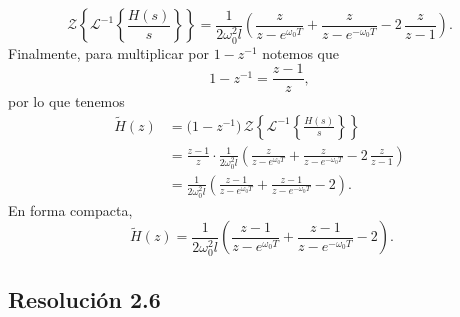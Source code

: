\documentclass[
  11pt,
  letterpaper,
   addpoints,
  answers
  ]{exam}
\begin{document}
\begin{questions}
\begin{solution}
\begin{equation}
\mathcal{Z}\!\left\{\mathcal{L}^{-1}\!\left\{\frac{H(s)}{s}\right\}\right\}
=\frac{1}{2\omega_0^{2} l}\left(
\frac{z}{z-e^{\omega_0 T}}+\frac{z}{z-e^{-\omega_0 T}}-2\,\frac{z}{z-1}
\right).
\end{equation}
Finalmente, para multiplicar por $1-z^{-1}$ notemos que
\begin{equation}
1-z^{-1}=\frac{z-1}{z},
\end{equation}
por lo que tenemos
\begin{align}
\tilde{H}(z)
&=\big(1-z^{-1}\big)\,\mathcal{Z}\!\left\{\mathcal{L}^{-1}\!\left\{\frac{H(s)}{s}\right\}\right\}\\
&=\frac{z-1}{z}\cdot\frac{1}{2\omega_0^{2} l}\left(
\frac{z}{z-e^{\omega_0 T}}+\frac{z}{z-e^{-\omega_0 T}}-2\,\frac{z}{z-1}
\right)\\
&=\frac{1}{2\omega_0^{2} l}\left(
\frac{z-1}{z-e^{\omega_0 T}}+\frac{z-1}{z-e^{-\omega_0 T}}-2
\right).
\end{align}
En forma compacta,
\begin{equation}
\boxed{\;
\tilde{H}(z)=\frac{1}{2\omega_0^{2} l}
\left(
\frac{z-1}{z-e^{\omega_0 T}}
+\frac{z-1}{z-e^{-\omega_0 T}}
-2
\right).}
\end{equation}
\subsection*{Resolución 2.6}


\end{solution}
\end{questions}
\end{document}
